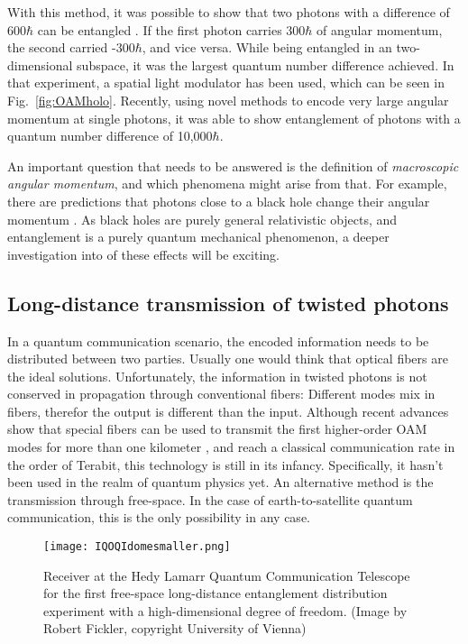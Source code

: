 \documentclass{article}
\begin{document}
With this method, it was possible to show that two photons with a difference of 600$\hbar$ can be entangled \cite{Fickler:2012hj}. If the first photon carries 300$\hbar$ of angular momentum, the second carried -300$\hbar$, and vice versa. While being entangled in an two-dimensional subspace, it was the largest quantum number difference achieved. In that experiment, a spatial light modulator has been used, which can be seen in Fig.~\ref{fig:OAMholo}. Recently, using novel methods to encode very large angular momentum at single photons, it was able to show entanglement of photons with a quantum number difference of 10,000$\hbar$.

An important question that needs to be answered is the definition of \textit{macroscopic angular momentum}, and which phenomena might arise from that. For example, there are predictions that photons close to a black hole change their angular momentum \cite{tamburini2011twisting}. As black holes are purely general relativistic objects, and entanglement is a purely quantum mechanical phenomenon, a deeper investigation into of these effects will be exciting.

\subsection{Long-distance transmission of twisted photons}
In a quantum communication scenario, the encoded information needs to be distributed between two parties. Usually one would think that optical fibers are the ideal solutions. Unfortunately, the information in twisted photons is not conserved in propagation through conventional fibers: Different modes mix in fibers, therefor the output is different than the input. Although recent advances show that special fibers can be used to transmit the first higher-order OAM modes for more than one kilometer \cite{bozinovic2013terabit}, and reach a classical communication rate in the order of Terabit, this technology is still in its infancy. Specifically, it hasn't been used in the realm of quantum physics yet. An alternative method is the transmission through free-space. In the case of earth-to-satellite quantum communication, this is the only possibility in any case.

\begin{figure}[h!]
\centering
\texttt{[image: IQOQIdomesmaller.png]}
\caption{Receiver at the Hedy Lamarr Quantum Communication Telescope for the first free-space long-distance entanglement distribution experiment with a high-dimensional degree of freedom. (Image by Robert Fickler, copyright University of Vienna)}
\label{fig:kuppel}
\end{figure}
\end{document}

